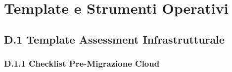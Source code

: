 
\chapter{\texorpdfstring{\textbf{Template e Strumenti Operativi}}{Appendice D - Template e Strumenti Operativi}}
\label{app:template}

\section{\texorpdfstring{\textbf{D.1 Template Assessment Infrastrutturale}}{D.1 - Template Assessment Infrastrutturale}}

\subsection{\texorpdfstring{\textbf{D.1.1 Checklist Pre-Migrazione Cloud}}{D.1.1 - Checklist Pre-Migrazione Cloud}}

